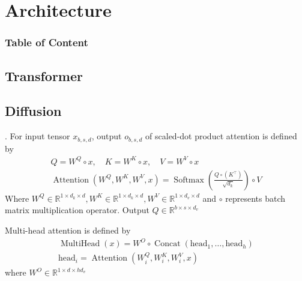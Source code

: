 \documentclass[8pt]{beamer}
\newcommand{\mbb}[1]{\mathbb{#1}}
\newcommand{\Softmax}[1]{\operatorname{Softmax}\!\left(#1\right)}
\newcommand{\Attention}[1]{\operatorname{Attention}\!\left(#1\right)}
\newcommand{\Concat}[1]{\operatorname{Concat}\!\left(#1\right)}
\begin{document}
\section{Architecture}
\begingroup
    \begin{frame}
        \frametitle{Table of Content}
        \tableofcontents
    \end{frame}
\endgroup
\subsection{Transformer}

\subsection{Diffusion}

\begin{frame}{.}
    For input tensor $x_{b,s,d}$, output $o_{b,s,d}$ of scaled-dot product attention is defined by 
    \[
    \begin{gathered}
        Q = W^Q \circ x, \quad K = W^K \circ x,\quad V = W^V \circ x \\
        \Attention{W^Q, W^K, W^V, x} = \Softmax{\frac{Q \circ (K^\top)}{\sqrt{d_k}}} \circ V
    \end{gathered}
    \]
    Where $W^Q \in \mbb{R}^{1 \times d_k \times d}, W^K \in \mbb{R}^{1 \times d_k \times d}, W^V \in \mbb{R}^{1\times d_v \times d}$ and $\circ$ represents batch matrix multiplication operator. Output $Q \in \mbb{R}^{b\times s \times d_v}$

    \bigskip
    Multi-head attention is defined by 
    \[
    \begin{gathered}
        \operatorname{MultiHead}(x) = W^O \circ \Concat{\text{head}_1, \dots, \text{head}_h} \\
        \text{head}_i = \Attention{W^Q_i, W^K_i, W^V_i, x}
    \end{gathered}
    \]
    where $W^O \in \mbb{R}^{1 \times d\times hd_v}$
\end{frame}
\end{document}
